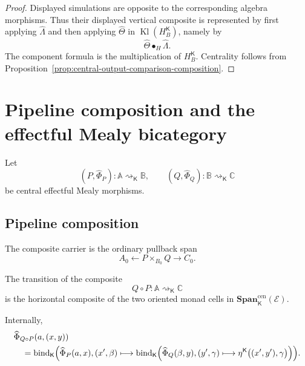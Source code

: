 \begin{proof}
Displayed simulations are opposite to the corresponding algebra morphisms.
Thus their displayed vertical composite is represented by first applying
\(\widehat\Lambda\) and then applying \(\widehat\Theta\) in
\(\operatorname{Kl}(H_B^{\mathsf K})\), namely by
\[
    \widehat\Theta\mathbin{\bullet_H}\widehat\Lambda.
\]
The component formula is the multiplication of \(H_B^{\mathsf K}\).
Centrality follows from
Proposition~\ref{prop:central-output-comparison-composition}.
\end{proof}

\section{Pipeline composition and the effectful Mealy bicategory}
\label{sec:effectful-pipeline-bicategory}

Let
\[
    (P,\widehat\Phi_P):
    \mathbb A\rightsquigarrow_{\mathsf K}\mathbb B,
    \qquad
    (Q,\widehat\Phi_Q):
    \mathbb B\rightsquigarrow_{\mathsf K}\mathbb C
\]
be central effectful Mealy morphisms.

\subsection{Pipeline composition}
\label{subsec:central-effectful-pipeline-composition}

The composite carrier is the ordinary pullback span
\[
    A_0
    \xleftarrow{}
    P\times_{B_0}Q
    \xrightarrow{}
    C_0.
\]

\begin{definition}
\label{def:effectful-pipeline-transition}
The transition of the composite
\[
    Q\circ P:
    \mathbb A\rightsquigarrow_{\mathsf K}\mathbb C
\]
is the horizontal composite of the two oriented monad cells in
\(\mathbf{Span}^{\mathrm{cen}}_{\mathsf K}(\mathcal E)\).

Internally,
\[
\begin{aligned}
&
\widehat\Phi_{Q\circ P}(a,(x,y))
\\
&\quad=
\operatorname{bind}_{\mathsf K}
\Bigl(
    \widehat\Phi_P(a,x),
    (x',\beta)
    \longmapsto
    \operatorname{bind}_{\mathsf K}
    \Bigl(
        \widehat\Phi_Q(\beta,y),
        (y',\gamma)
        \longmapsto
        \eta^{\mathsf K}
        \bigl(
            (x',y'),
            \gamma
        \bigr)
    \Bigr)
\Bigr).
\end{aligned}
\]
\end{definition}


